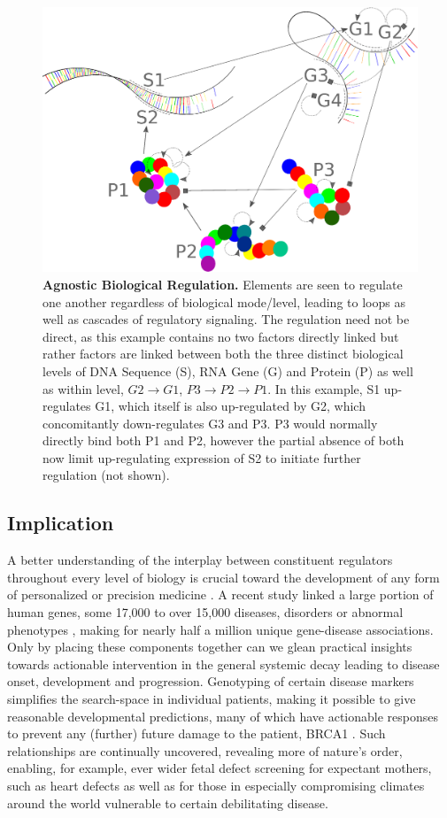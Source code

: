 \begin{figure}%
\centering
\includegraphics[width=1\linewidth]{2/DNA2.eps}
\caption{\textbf{Agnostic Biological Regulation.} Elements are seen to regulate one another regardless of biological mode/level, leading to loops as well as cascades of regulatory signaling. The regulation need not be direct, as this example contains no two factors directly linked but rather factors are linked between both the three distinct biological levels of DNA Sequence (S), RNA Gene (G) and Protein (P) as well as within level, \ie $G2\to G1$, $P3\to P2\to P1$. In this example, S1 up-regulates G1, which itself is also up-regulated by G2, which concomitantly down-regulates G3 and P3. P3 would normally directly bind both P1 and P2, however the partial absence of both now limit up-regulating expression of S2 to initiate further regulation (not shown).
}
\label{fig:DNA}
\end{figure}


\subsection{Implication}
\label{sec:practical}
A better understanding of the interplay between constituent regulators throughout every level of biology is crucial toward the development of any form of personalized or precision medicine \citep{barabasi2011network}. A recent study linked a large portion of human genes, some 17,000 to over 15,000 diseases, disorders or abnormal phenotypes \citep{pinero2015disgenet}, making for nearly half a million unique gene-disease associations. Only by placing these components together can we glean practical insights towards actionable intervention in the general systemic decay leading to disease onset, development and progression. Genotyping of certain disease markers simplifies the search-space in individual patients, making it possible to give reasonable developmental predictions, many of which have actionable responses to prevent any (further) future damage to the patient, \eg BRCA1 \citep{lerman1996brca1}. Such relationships are continually uncovered, revealing more of nature's order, enabling, for example, ever wider fetal defect screening for expectant mothers, such as heart defects \citep{hyett1999using} as well as for those in especially compromising climates around the world vulnerable to certain debilitating disease.

